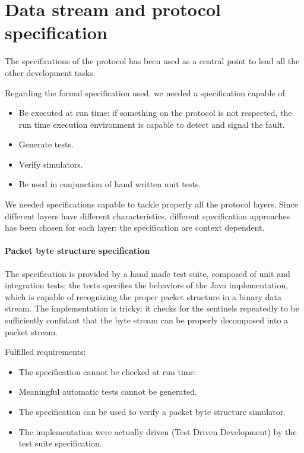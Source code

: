 \documentclass{article} \usepackage{times}
\begin{document}
\section{Data stream and protocol specification}
\label{sec:data_stream_and_protocol_specification}

The specifications of the protocol has been used as a central point to
lead all the other development tasks.

Regarding the formal specification used, we needed a specification
capable of:

\begin{itemize}
\item Be executed at run time: if something on the protocol is not
  respected, the run time execution environment is capable to detect
  and signal the fault.
\item Generate tests.
\item Verify simulators.
\item Be used in conjunction of hand written unit tests.
\end{itemize}

We needed specifications capable to tackle properly all the protocol
layers.  Since different layers have different characteristics,
different specification approaches has been chosen for each layer: the
specification are context dependent.

\paragraph{Packet byte structure specification}

The specification is provided by a hand made test suite, composed of
unit and integration tests; the tests specifies the behaviors of the
Java implementation, which is capable of recognizing the proper packet
structure in a binary data stream. The implementation is tricky: it
checks for the sentinels repeatedly to be sufficiently confidant that
the byte stream can be properly decomposed into a packet stream.

Fulfilled requirements:

\begin{itemize}
\item The specification cannot be checked at run time.
\item Meaningful automatic tests cannot be generated.
\item The specification can be used to verify a packet byte structure
  simulator.
\item The implementation were actually driven (Test Driven
  Development) by the test suite specification.
\end{itemize}
\end{document}
